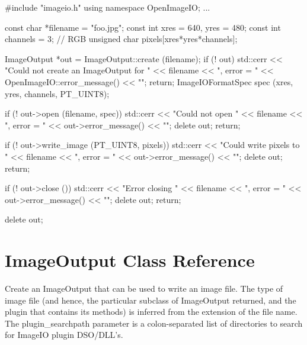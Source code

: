 \begin{code}
        #include "imageio.h"
        using namespace OpenImageIO;
        ...

        const char *filename = "foo.jpg";
        const int xres = 640, yres = 480;
        const int channels = 3;  // RGB
        unsigned char pixels[xres*yres*channels];

        ImageOutput *out = ImageOutput::create (filename);
        if (! out) {
            std::cerr << "Could not create an ImageOutput for " 
                      << filename << ", error = " 
                      << OpenImageIO::error_message() << "\n";
            return;
        }
        ImageIOFormatSpec spec (xres, yres, channels, PT_UINT8);

        if (! out->open (filename, spec)) {
            std::cerr << "Could not open " << filename 
                      << ", error = " << out->error_message() << "\n";
            delete out;
            return;
        }

        if (! out->write_image (PT_UINT8, pixels)) {
            std::cerr << "Could write pixels to " << filename 
                      << ", error = " << out->error_message() << "\n";
            delete out;
            return;
        }

        if (! out->close ()) {
            std::cerr << "Error closing " << filename 
                      << ", error = " << out->error_message() << "\n";
            delete out;
            return;
        }

        delete out;
\end{code}



\section{{\kw ImageOutput} Class Reference}
\label{sec:imageoutput:reference}


Create an {\kw ImageOutput} that can be used to write an image file.
The type of image file (and hence, the particular subclass of {\kw
  ImageOutput} returned, and the plugin that contains its methods) is
inferred from the extension of the file name.  The {\kw
  plugin_searchpath} parameter is a colon-separated list of directories
to search for ImageIO plugin DSO/DLL's.

